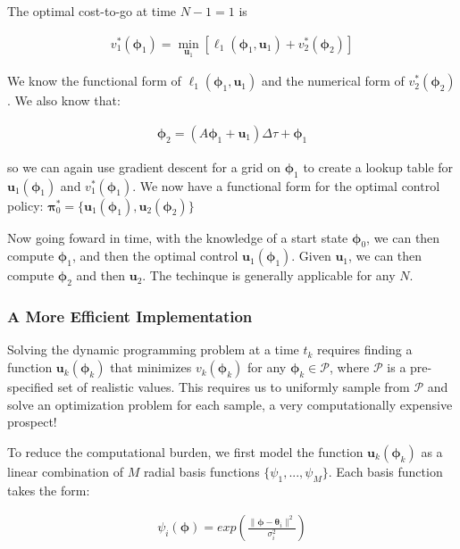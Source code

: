 \documentclass{article} %
\begin{document}
The optimal cost-to-go at time $N-1=1$ is

\begin{align*}
v^*_{1} \left( \bm{\phi}_{1} \right) = \min_{\bm{u}_{1}} \left[ \ell_1 \left( \bm{\phi}_{1}, \bm{u}_{1} \right) + v^*_2 \left( \bm{\phi}_2 \right) \right]
\end{align*}

We know the functional form of $\ell_1 \left( \bm{\phi}_{1}, \bm{u}_{1} \right)$ and the
numerical form of $v^*_2 \left( \bm{\phi}_2 \right)$. We also know that:

\begin{align*}
\bm{\phi}_2 = \left( A\bm{\phi}_1 + \bm{u}_1 \right) \Delta\tau + \bm{\phi}_1
\end{align*}

so we can again use gradient descent for a grid on $\bm{\phi}_1$ to create a lookup
table for $\bm{u}_1(\bm{\phi}_1)$ and $v^*_1 \left( \bm{\phi}_1 \right)$. We now have
a functional form for the optimal control policy: $\bm{\pi}_0^* = \{ \bm{u}_1(\bm{\phi}_1), \bm{u}_2(\bm{\phi}_2) \}$

Now going foward in time, with the knowledge of a start state $\bm{\phi}_0$, we can then
compute $\bm{\phi}_1$, and then the optimal control $\bm{u}_1 \left( \bm{\phi}_1 \right)$.
Given $\bm{u}_1$, we can then compute $\bm{\phi}_2$ and then $\bm{u}_2$. The techinque
is generally applicable for any $N$.


\subsubsection{A More Efficient Implementation}

Solving the dynamic programming problem at a time $t_k$ requires finding a function
$\bm{u}_k(\bm{\phi}_k)$ that minimizes $v_k(\bm{\phi}_k)$ for any
$\bm{\phi}_k \in \mathcal{P}$, where $\mathcal{P}$ is a pre-specified
set of realistic values. This requires us to uniformly
sample from $\mathcal{P}$ and solve an optimization problem for each sample, a
very computationally expensive prospect!

To reduce the computational burden, we first model the function $\bm{u}_k(\bm{\phi}_k)$
as a linear combination of $M$ radial basis functions
$\{ \psi_1, ..., \psi_M \}$. Each basis function takes the form:

\begin{align*}
\psi_i(\bm{\phi}) = exp \left( \frac{\| \bm{\phi} - \bm{\theta}_i \| ^2 }{\sigma_i ^2} \right) 
\end{align*}
\end{document}
